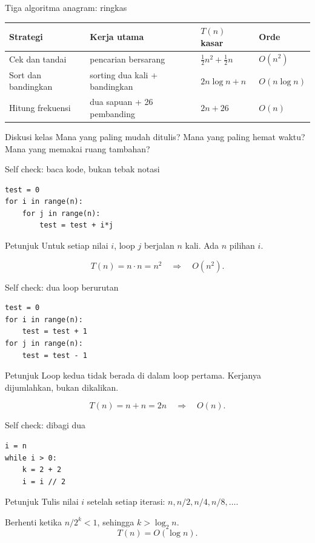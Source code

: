 \documentclass[aspectratio=169,11pt]{beamer}
\begin{document}
\begin{frame}{Tiga algoritma anagram: ringkas}
\begin{table}\small
\begin{tabular}{p{}p{}p{}p{}}
\toprule
Strategi & Kerja utama & $T(n)$ kasar & Orde\\
\midrule
Cek dan tandai & pencarian bersarang & $\frac{1}{2}n^2+\frac{1}{2}n$ & $O(n^2)$\\
Sort dan bandingkan & sorting dua kali + bandingkan & $2n\log n+n$ & $O(n\log n)$\\
Hitung frekuensi & dua sapuan + 26 pembanding & $2n+26$ & $O(n)$\\
\bottomrule
\end{tabular}
\end{table}
\pause
\begin{block}{Diskusi kelas}
Mana yang paling mudah ditulis? Mana yang paling hemat waktu? Mana yang memakai ruang tambahan?
\end{block}
\end{frame}

\begin{frame}[fragile]{Self check: baca kode, bukan tebak notasi}
\begin{lstlisting}
test = 0
for i in range(n):
    for j in range(n):
        test = test + i*j
\end{lstlisting}
\pause
\begin{block}{Petunjuk}
Untuk setiap nilai $i$, loop $j$ berjalan $n$ kali. Ada $n$ pilihan $i$.
\end{block}
\pause
\[
T(n)=n\cdot n=n^2 \quad \Rightarrow \quad O(n^2).
\]
\end{frame}

\begin{frame}[fragile]{Self check: dua loop berurutan}
\begin{lstlisting}
test = 0
for i in range(n):
    test = test + 1
for j in range(n):
    test = test - 1
\end{lstlisting}
\pause
\begin{block}{Petunjuk}
Loop kedua tidak berada di dalam loop pertama. Kerjanya dijumlahkan, bukan dikalikan.
\end{block}
\pause
\[
T(n)=n+n=2n \quad \Rightarrow \quad O(n).
\]
\end{frame}

\begin{frame}[fragile]{Self check: dibagi dua}
\begin{lstlisting}
i = n
while i > 0:
    k = 2 + 2
    i = i // 2
\end{lstlisting}
\pause
\begin{block}{Petunjuk}
Tulis nilai $i$ setelah setiap iterasi: $n, n/2, n/4, n/8, \ldots$.
\end{block}
\pause
Berhenti ketika $n/2^k < 1$, sehingga $k > \log_2 n$.
\[
T(n)=O(\log n).
\]
\end{frame}
\end{document}
